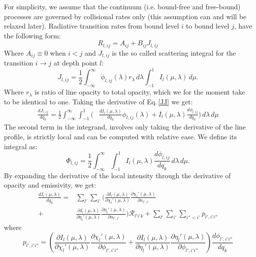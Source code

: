 \documentclass[referee]{aa}
\begin{document}
For simplicity, we assume that the continuum (i.e. bound-free and free-bound) processes are governed by collisional rates only (this assumption can and will be relaxed later). Radiative transition rates from bound level $i$ to bound level $j$, have the following form:
\begin{equation}
 R_{l,ij} = A_{ij} + B_{ij} J_{l,ij}
\end{equation}
Where $A_{ij} \equiv 0$ when $i<j$ and $J_{l,ij}$ is the so called scattering integral for the transition $i\rightarrow j$ at depth point $l$:
\begin{equation}
 J_{l,ij} = \frac{1}{2} \int_{-\infty}^{\infty} \phi_{l,ij}(\lambda) r_{\lambda}\,d\lambda \int_{-1}^{1} I_l(\mu,\lambda)\,d\mu. 
 \label{JJ}
\end{equation}
Where $r_{\lambda}$ is ratio of line opacity to total opacity, which we for the moment take to be identical to one. Taking the derivative of Eq.\,\ref{JJ} we get:
\begin{align}
 \frac{d J_{l,ij}}{d q_k} = \frac{1}{2} \int_{-\infty}^{\infty} \int_{-1}^{1} ( & \frac{d I_l(\mu,\lambda)}{d q_k} \phi_{l,ij}(\lambda) + %
 I_l(\mu,\lambda) \frac{d \phi_{l,ij}}{d q_k} )\,d\lambda\,d\mu
 \label{JJ2}
\end{align}
The second term in the integrand, involves only taking the derivative of the line profile, is strictly local and can be computed with relative ease. We define its integral as:
\begin{equation}
\Phi_{l,ij} = \frac{1}{2} \int_{-\infty}^{\infty} \int_{-1}^{1} I_l(\mu,\lambda) \frac{d \phi_{l,ij}}{d q_k}\,d\lambda\,d\mu.
\end{equation}
By expanding the derivative of the local intensity through the derivative of opacity and emissivity, we get:
\begin{align}
\frac{d I_l(\mu,\lambda)}{d q_k} = & \sum_{l'} \sum_{i'} ( \frac{\partial I_l(\mu,\lambda)}{\partial \chi_l'(\mu,\lambda)} \frac{\partial \chi_l'(\mu,\lambda)}{\partial n_{l',i'}} \nonumber \\
+& \frac{\partial I_l(\mu,\lambda)}{\partial \eta_l'(\mu,\lambda)} \frac{\partial \eta_l'(\mu,\lambda)}{\partial n_{l',i'}} ) {\mathcal R}_{l'i'k}
+  \sum_{l'} \sum_{i'} \sum_{i''<i'}  p_{l',i'i''}
\end{align}
where 
\begin{equation}
 p_{l',i'i''} = \left ( \frac{\partial I_l(\mu,\lambda)}{\partial \chi_l'(\mu,\lambda)} \frac{\partial \chi_l'(\mu,\lambda)}{\partial \phi_{l',i'i''}} + 
\frac{\partial I_l(\mu,\lambda)}{\partial \eta_l'(\mu,\lambda)} \frac{\partial \eta_l'(\mu,\lambda)}{\partial \phi_{l',i'i''}} \right ) \frac{d \phi_{l',i'i''}}{d q_k}
\end{equation}
\end{document}
